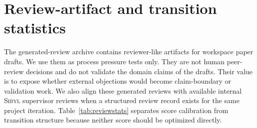 \documentclass{article}
\newcommand{\sibyl}{\textsc{Sibyl}}
\begin{document}
\section{Review-artifact and transition statistics}
\label{sec:appendix-review-transition-stats}

The generated-review archive contains reviewer-like artifacts for workspace paper drafts. We use them as process pressure tests only. They are not human peer-review decisions and do not validate the domain claims of the drafts. Their value is to expose whether external objections would become claim-boundary or validation work. We also align these generated reviews with available internal \sibyl{} supervisor reviews when a structured review record exists for the same project iteration. Table~\ref{tab:reviewstats} separates score calibration from transition structure because neither score should be optimized directly.
\end{document}
